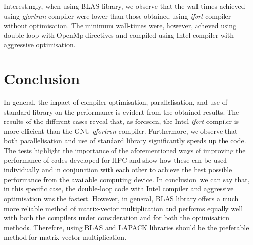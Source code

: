 \documentclass[11pt, oneside]{article}   	%
\begin{document}
Interestingly, when using BLAS library, we observe that the wall times achieved using \textit{gfortran} compiler were lower than those obtained using \textit{ifort} compiler without optimisation. The minimum wall-times were, however, acheved using double-loop with OpenMp directives and compiled using Intel compiler with aggressive optimisation.   

\section{Conclusion}
In general, the impact of compiler optimisation, parallelisation, and use of standard library on the performance is evident from the obtained results. The results of the different cases reveal that, as foreseen, the Intel \textit{ifort} compiler is more efficient than the GNU \textit{gfortran} compiler. Furthermore, we observe that both parallelisation and use of standard library significantly speeds up the code. The tests highlight the importance of the aforementioned ways of improving the performance of codes developed for HPC and show how these can be used individually and in conjunction with each other to achieve the best possible performance from the available computing device. In conclusion, we can say that, in this specific case, the double-loop code with Intel compiler and aggressive optimisation was the fastest. However, in general, BLAS library offers a much more reliable method of matrix-vector multiplication and performs equally well with both the compilers under consideration and for both the optimisation methods. Therefore, using BLAS and LAPACK libraries should be the preferable method for matrix-vector multiplication. 



\end{document}
